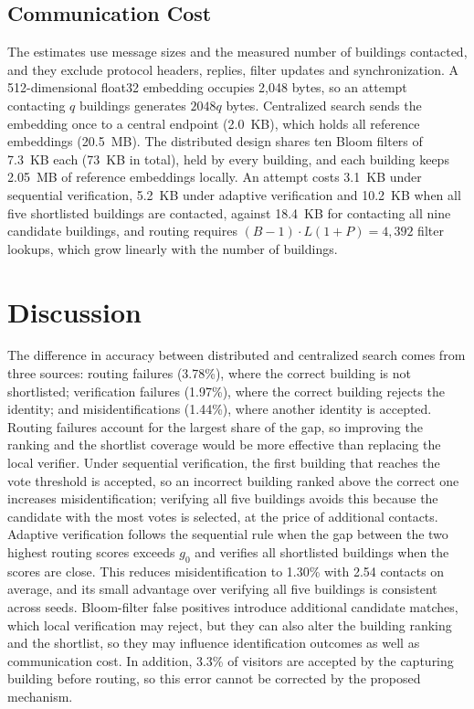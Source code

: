 \documentclass[pdflatex,sn-mathphys-num]{sn-jnl}%
\theoremstyle{thmstyleone}%
\theoremstyle{thmstyletwo}%
\theoremstyle{thmstylethree}%
\begin{document}
\subsection{Communication Cost}
\label{sec:cost}

The estimates use message sizes and the measured number of buildings contacted, and they exclude protocol headers, replies, filter updates and synchronization. A 512-dimensional float32 embedding occupies 2,048 bytes, so an attempt contacting $q$ buildings generates $2048q$ bytes. Centralized search sends the embedding once to a central endpoint (2.0~KB), which holds all reference embeddings (20.5~MB). The distributed design shares ten Bloom filters of 7.3~KB each (73~KB in total), held by every building, and each building keeps 2.05~MB of reference embeddings locally. An attempt costs 3.1~KB under sequential verification, 5.2~KB under adaptive verification and 10.2~KB when all five shortlisted buildings are contacted, against 18.4~KB for contacting all nine candidate buildings, and routing requires $(B-1)\cdot L(1+P)=4{,}392$ filter lookups, which grow linearly with the number of buildings.



\section{Discussion}
\label{sec:discussion}

The difference in accuracy between distributed and centralized search comes from three sources: routing failures (3.78\%), where the correct building is not shortlisted; verification failures (1.97\%), where the correct building rejects the identity; and misidentifications (1.44\%), where another identity is accepted. Routing failures account for the largest share of the gap, so improving the ranking and the shortlist coverage would be more effective than replacing the local verifier. Under sequential verification, the first building that reaches the vote threshold is accepted, so an incorrect building ranked above the correct one increases misidentification; verifying all five buildings avoids this because the candidate with the most votes is selected, at the price of additional contacts. Adaptive verification follows the sequential rule when the gap between the two highest routing scores exceeds $g_0$ and verifies all shortlisted buildings when the scores are close. This reduces misidentification to 1.30\% with 2.54 contacts on average, and its small advantage over verifying all five buildings is consistent across seeds. Bloom-filter false positives introduce additional candidate matches, which local verification may reject, but they can also alter the building ranking and the shortlist, so they may influence identification outcomes as well as communication cost. In addition, 3.3\% of visitors are accepted by the capturing building before routing, so this error cannot be corrected by the proposed mechanism.
\end{document}
